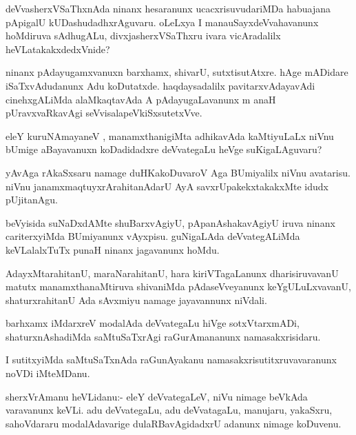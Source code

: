 \documentclass{article}
\begin{document}
\begin{mn}%
deVvasherxVSaThxnAda ninanx hesaranunx ucacxrisuvudariMDa habuajana pApigalU 
kUDashudadhxrAguvaru. oLeLxya I manauSayxdeVvahavanunx hoMdiruva sAdhugALu, 
divxjasherxVSaThxru ivara vicAradalilx heVLatakakxdedxVnide?
\end{mn}

\begin{mn}%
ninanx pAdayugamxvanuxn barxhamx, shivarU, sutxtisutAtxre. hAge mADidare iSaTxvAdudanunx 
Adu koDutatxde. haqdaysadalilx pavitarxvAdayavAdi cinehxgALiMda alaMkaqtavAda A 
pAdayugaLavanunx m anaH pUravxvaRkavAgi seVvisalapeVkiSxsutetxVve.
\end{mn}

\begin{mn}%
eleY kuruNAmayaneV , manamxthanigiMta adhikavAda kaMtiyuLaLx niVnu bUmige aBayavanuxn 
koDadidadxre deVvategaLu heVge suKigaLAguvaru?
\end{mn}

\begin{mn}%
yAvAga rAkaSxsaru namage duHKakoDuvaroV Aga BUmiyalilx niVnu avatarisu. niVnu 
janamxmaqtuyxrArahitanAdarU AyA savxrUpakekxtakakxMte idudx pUjitanAgu.
\end{mn}

\begin{mn}%
beVyisida suNaDxdAMte shuBarxvAgiyU, pApanAshakavAgiyU iruva  ninanx cariterxyiMda 
BUmiyanunx vAyxpisu. guNigaLAda deVvategALiMda keVLalalxTuTx punaH ninanx jagavanunx hoMdu.
\end{mn}

\begin{mn}%
AdayxMtarahitanU, maraNarahitanU, hara kiriVTagaLanunx dharisiruvavanU matutx 
manamxthanaMtiruva shivaniMda pAdaseVveyanunx keYgULuLxvavanU, shaturxrahitanU Ada 
sAvxmiyu namage jayavannunx niVdali.
\end{mn}

\begin{mn}%
barhxamx iMdarxreV modalAda deVvategaLu hiVge sotxVtarxmADi, shaturxnAshadiMda 
saMtuSaTxrAgi raGurAmananunx namasakxrisidaru.
\end{mn}

\begin{mn}%
I sutitxyiMda saMtuSaTxnAda raGunAyakanu namasakxrisutitxruvavaranunx noVDi iMteMDanu.
\end{mn}

\begin{mn}%
sherxVrAmanu heVLidanu:- eleY deVvategaLeV, niVu nimage beVkAda varavanunx keVLi. adu 
deVvategaLu, adu deVvatagaLu, manujaru, yakaSxru, sahoVdararu modalAdavarige 
dulaRBavAgidadxrU adanunx nimage koDuvenu.
\end{mn}
\end{document}

